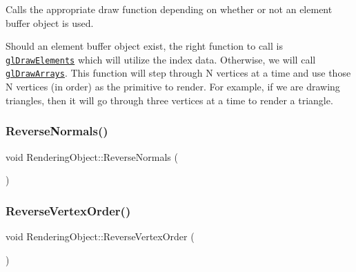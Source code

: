 Calls the appropriate draw function depending on whether or not an element buffer object is used.

Should an element buffer object exist, the right function to call is \href{https://www.opengl.org/sdk/docs/man/html/glDrawElements.xhtml}{\tt gl\+Draw\+Elements} which will utilize the index data. Otherwise, we will call \href{https://www.opengl.org/sdk/docs/man/html/glDrawArrays.xhtml}{\tt gl\+Draw\+Arrays}. This function will step through N vertices at a time and use those N vertices (in order) as the primitive to render. For example, if we are drawing triangles, then it will go through three vertices at a time to render a triangle. \hypertarget{class_rendering_object_a761ad8574fc4424e12487512bb30067c}{}\label{class_rendering_object_a761ad8574fc4424e12487512bb30067c}
\subsubsection{\texorpdfstring{Reverse\+Normals()}{ReverseNormals()}}
{\footnotesize\ttfamily void Rendering\+Object\+::\+Reverse\+Normals (\begin{DoxyParamCaption}{ }\end{DoxyParamCaption})\hspace{0.3cm}{\ttfamily [virtual]}}

\hypertarget{class_rendering_object_a2f175770ceadac2fea979f191974665b}{}\label{class_rendering_object_a2f175770ceadac2fea979f191974665b}
\subsubsection{\texorpdfstring{Reverse\+Vertex\+Order()}{ReverseVertexOrder()}}
{\footnotesize\ttfamily void Rendering\+Object\+::\+Reverse\+Vertex\+Order (\begin{DoxyParamCaption}{ }\end{DoxyParamCaption})\hspace{0.3cm}{\ttfamily [virtual]}}

\hypertarget{class_rendering_object_aa627eb310f11d0e04dbbb3665f58bb4e}{}\label{class_rendering_object_aa627eb310f11d0e04dbbb3665f58bb4e}
